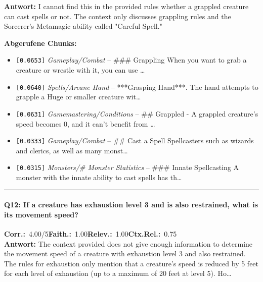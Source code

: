 \noindent\textbf{Antwort:} I cannot find this in the provided rules whether a grappled creature can cast spells or not. The context only discusses grappling rules and the Sorcerer's Metamagic ability called "Careful Spell."

\noindent\textbf{Abgerufene Chunks:}
\begin{itemize}[noitemsep, topsep=2pt]
  \item[\textbf{\#1}] \texttt{[0.0653]} \textit{Gameplay/Combat} -- \#\#\# Grappling  When you want to grab a creature or wrestle with it, you can use \ldots
  \item[\textbf{\#2}] \texttt{[0.0640]} \textit{Spells/Arcane Hand} -- ***Grasping Hand***. The hand attempts to grapple a Huge or smaller creature wit\ldots
  \item[\textbf{\#3}] \texttt{[0.0631]} \textit{Gamemastering/Conditions} -- \#\# Grappled  - A grappled creature's speed becomes 0, and it can't benefit from \ldots
  \item[\textbf{\#4}] \texttt{[0.0333]} \textit{Gameplay/Combat} -- \#\# Cast a Spell  Spellcasters such as wizards and clerics, as well as many monst\ldots
  \item[\textbf{\#5}] \texttt{[0.0315]} \textit{Monsters/# Monster Statistics} -- \#\#\# Innate Spellcasting  A monster with the innate ability to cast spells has th\ldots
\end{itemize}
\vspace{4pt}
\hrule
\vspace{6pt}

\paragraph{Q12: If a creature has exhaustion level 3 and is also restrained, what is its movement speed?}
\noindent \textbf{Corr.:}~4.00/5\quad \textbf{Faith.:}~1.00\quad \textbf{Relev.:}~1.00\quad \textbf{Ctx.Rel.:}~0.75\\

\noindent\textbf{Antwort:} The context provided does not give enough information to determine the movement speed of a creature with exhaustion level 3 and also restrained. The rules for exhaustion only mention that a creature's speed is reduced by 5 feet for each level of exhaustion (up to a maximum of 20 feet at level 5). Ho\ldots

